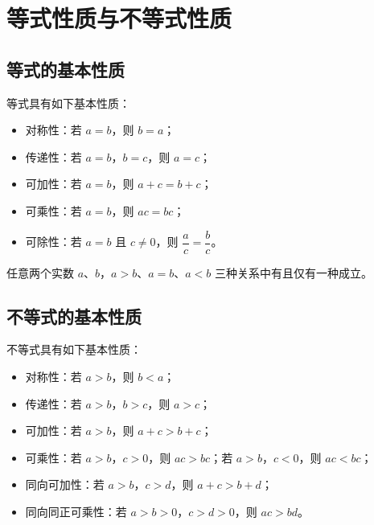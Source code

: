 
\section{等式性质与不等式性质}
\subsection{等式的基本性质}
\begin{definition}[等式的基本性质]
等式具有如下基本性质：
\begin{itemize}
    \item 对称性：若 $a=b$，则 $b=a$；
    \item 传递性：若 $a=b$，$b=c$，则 $a=c$；
    \item 可加性：若 $a=b$，则 $a+c=b+c$；
    \item 可乘性：若 $a=b$，则 $ac=bc$；
    \item 可除性：若 $a=b$ 且 $c \neq 0$，则 $\dfrac{a}{c}=\dfrac{b}{c}$。
\end{itemize}
\end{definition}
\begin{axiom}[实数的有序性]
任意两个实数 $a$、$b$，$a>b$、$a=b$、$a<b$ 三种关系中有且仅有一种成立。
\end{axiom}
\subsection{不等式的基本性质}
\begin{definition}[不等式的基本性质]
不等式具有如下基本性质：
\begin{itemize}
    \item 对称性：若 $a>b$，则 $b<a$；
    \item 传递性：若 $a>b$，$b>c$，则 $a>c$；
    \item 可加性：若 $a>b$，则 $a+c>b+c$；
    \item 可乘性：若 $a>b$，$c>0$，则 $ac>bc$；若 $a>b$，$c<0$，则 $ac<bc$；
    \item 同向可加性：若 $a>b$，$c>d$，则 $a+c>b+d$；
    \item 同向同正可乘性：若 $a>b>0$，$c>d>0$，则 $ac>bd$。
\end{itemize}
\end{definition}
